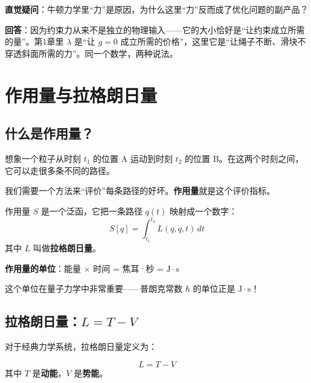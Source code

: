 \textbf{直觉疑问}：牛顿力学里“力”是原因，为什么这里“力”反而成了优化问题的副产品？

\textbf{回答}：因为约束力从来不是独立的物理输入——它的大小恰好是“让约束成立所需的量”。第1章里 $\lambda$ 是“让 $g = 0$ 成立所需的价格”，这里它是“让绳子不断、滑块不穿透斜面所需的力”。同一个数学，两种说法。

\section{作用量与拉格朗日量}

\subsection{什么是作用量？}

想象一个粒子从时刻 $t_1$ 的位置 A 运动到时刻 $t_2$ 的位置 B。在这两个时刻之间，它可以走很多条不同的路径。

我们需要一个方法来“评价”每条路径的好坏。\textbf{作用量}就是这个评价指标。

\begin{definition}[作用量]
作用量 $S$ 是一个泛函，它把一条路径 $q(t)$ 映射成一个数字：
\begin{equation}
S[q] = \int_{t_1}^{t_2} L(q, \dot{q}, t) \, dt
\end{equation}
其中 $L$ 叫做\textbf{拉格朗日量}。
\end{definition}

\textbf{作用量的单位}：能量 $\times$ 时间 = 焦耳·秒 = $\mathrm{J \cdot s}$

这个单位在量子力学中非常重要——普朗克常数 $\hbar$ 的单位正是 $\mathrm{J \cdot s}$！

\subsection{拉格朗日量：$L = T - V$}

对于经典力学系统，拉格朗日量定义为：

\begin{definition}[拉格朗日量]
\begin{equation}
\boxed{L = T - V}
\end{equation}
其中 $T$ 是\textbf{动能}，$V$ 是\textbf{势能}。
\end{definition}

